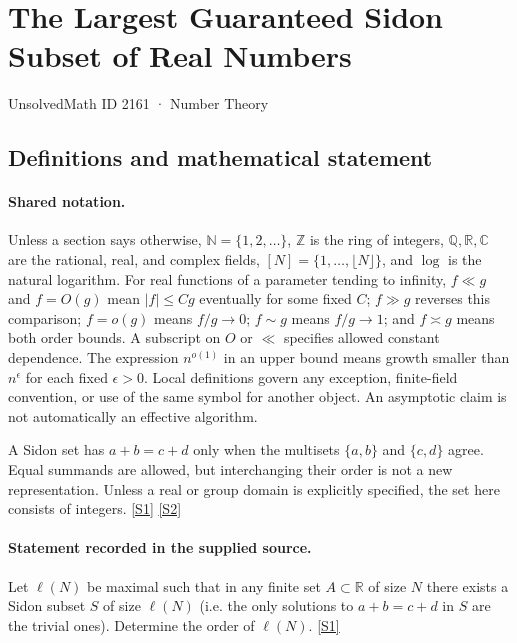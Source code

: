 \documentclass[11pt,a4paper]{article}
\newcommand{\N}{\mathbb{N}}
\newcommand{\Z}{\mathbb{Z}}
\newcommand{\Q}{\mathbb{Q}}
\newcommand{\R}{\mathbb{R}}
\newcommand{\C}{\mathbb{C}}
\newcommand{\sref}[2]{\hyperlink{source:#1:#2}{[S#2]}}
\begin{document}

\setcounter{section}{2160}

\section{The Largest Guaranteed Sidon Subset of Real Numbers}\label{2161}

{\small\sffamily UnsolvedMath ID 2161 · Number Theory}

\subsection{Definitions and mathematical statement}

\paragraph{Shared notation.}Unless a section says otherwise, $\N=\{1,2,\ldots\}$,
$\Z$ is the ring of integers, $\Q,\R,\C$ are the rational, real, and complex
fields, $[N]=\{1,\ldots,\lfloor N\rfloor\}$, and $\log$ is the natural
logarithm. For real functions of a parameter tending to infinity,
$f\ll g$ and $f=O(g)$ mean $|f|\leq Cg$ eventually for some fixed $C$;
$f\gg g$ reverses this comparison; $f=o(g)$ means $f/g\to0$;
$f\sim g$ means $f/g\to1$; and $f\asymp g$ means both order bounds.
A subscript on $O$ or $\ll$ specifies allowed constant dependence.
The expression $n^{o(1)}$ in an upper bound means growth smaller than
$n^\epsilon$ for each fixed $\epsilon>0$. Local definitions govern any
exception, finite-field convention, or use of the same symbol for another
object. An asymptotic claim is not automatically an effective algorithm.



A Sidon set has $a+b=c+d$ only when the multisets $\{a,b\}$ and $\{c,d\}$ agree. Equal summands are allowed, but interchanging their order is not a new representation. Unless a real or group domain is explicitly specified, the set here consists of integers. \sref{2161}{1} \sref{2161}{2}

\paragraph{Statement recorded in the supplied source.}
Let $\ell(N)$ be maximal such that in any finite set $A\subset \mathbb{R}$ of size $N$ there exists a Sidon subset $S$ of size $\ell(N)$ (i.e. the only solutions to $a+b=c+d$ in $S$ are the trivial ones). Determine the order of $\ell(N)$. \sref{2161}{1}
\end{document}
